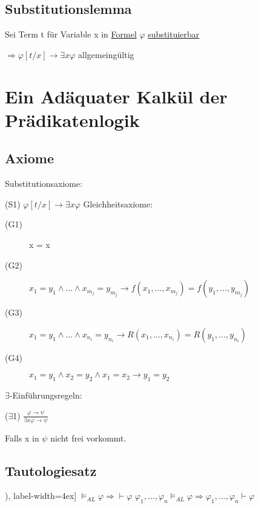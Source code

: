 \documentclass[12pt,a4paper]{article} %
\begin{document}
	\subsection{Substitutionslemma}
	Sei Term t für Variable x in \hyperref[Formel]{Formel} $\varphi$ \hyperref[Substituierbar]{substituierbar} 
	
	$\Rightarrow \varphi[t/x] \rightarrow \exists x \varphi$ allgemeingültig
	
	\section{Ein Adäquater Kalkül der Prädikatenlogik}
	
	\subsection{Axiome}
	Substitutionsaxiome:
	
	(S1) $\varphi[t/x] \rightarrow \exists x \varphi$
	\newline	
	Gleichheitsaxiome:
	
	\begin{description}
		\item[(G1)] x = x
		\item[(G2)] $x_1 = y_1 \land ... \land x_{m_j} = y_{m_j} \rightarrow f(x_1, ..., x_{m_j}) = f(y_1, ..., y_{m_j})$
		\item[(G3)] $x_1 = y_1 \land ... \land x_{n_i} = y_{n_i} \rightarrow R(x_1, ..., x_{n_i}) = R(y_1, ..., y_{n_i})$
		\item[(G4)] $x_1 = y_1 \land x_2 = y_2 \land x_1 = x_2 \rightarrow y_1 = y_2$
	\end{description} 
	$\exists$-Einführungsregeln:
	
	($\exists$1) $\frac{\varphi \rightarrow \psi}{\exists x \varphi \rightarrow \psi}$ 
	
	Falls x in $\psi$ nicht frei vorkommt. 
	
	\subsection{Tautologiesatz}
	\begin{tasks}[counter-format=(tsk[r]), label-width=4ex]
		\task $\vDash_{AL} \varphi \Rightarrow \hyperref[Beweisbar]{\vdash} \varphi$ 
		\task $\varphi_1, ..., \varphi_n \vDash_{AL} \varphi \Rightarrow \varphi_1, ..., \varphi_n \hyperref[Beweisbar]{\vdash} \varphi$
	\end{tasks}
\end{document}
